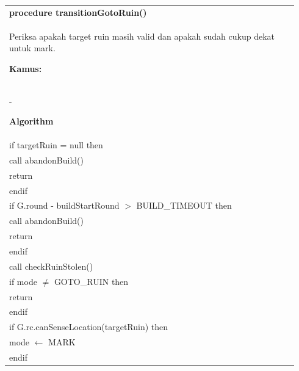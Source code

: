 \documentclass{article}
\newenvironment{pseudobox}
{
\centering
\begin{longtable}{|p{0.94\linewidth}|}
\hline
}
{
\\ \hline
\end{longtable}
\vspace{0.05cm}
}
\begin{document}
\begin{pseudobox}
\textbf{procedure transitionGotoRuin()} \\
{ Periksa apakah target ruin masih valid dan apakah sudah cukup dekat untuk mark. }

\textbf{Kamus:} \\
\hspace*{1em} -

\textbf{Algorithm} \\
\hspace*{1em} if targetRuin = null then \\
\hspace*{2em} call abandonBuild() \\
\hspace*{2em} return \\
\hspace*{1em} endif \\

\hspace*{1em} if G.round - buildStartRound $>$ BUILD\_TIMEOUT then \\
\hspace*{2em} call abandonBuild() \\
\hspace*{2em} return \\
\hspace*{1em} endif \\

\hspace*{1em} call checkRuinStolen() \\

\hspace*{1em} if mode $\neq$ GOTO\_RUIN then \\
\hspace*{2em} return \\
\hspace*{1em} endif \\

\hspace*{1em} if G.rc.canSenseLocation(targetRuin) then \\
\hspace*{2em} mode $\leftarrow$ MARK \\
\hspace*{1em} endif
\end{pseudobox}
\end{document}
